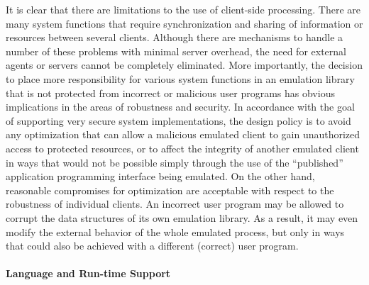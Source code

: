 
It is clear that there are limitations to the use of client-side
processing. There are many system functions that require
synchronization and sharing of information or resources between
several clients.  Although there are mechanisms to handle a number of
these problems with minimal server overhead, the need for external
agents or servers cannot be completely eliminated. More importantly,
the decision to place more responsibility for various system functions
in an emulation library that is not protected from incorrect or
malicious user programs has obvious implications in the areas of
robustness and security. In accordance with the goal of supporting
very secure system implementations, the design policy is to avoid any
optimization that can allow a malicious emulated client to gain
unauthorized access to protected resources, or to affect the integrity
of another emulated client in ways that would not be possible simply
through the use of the ``published'' application programming interface
being emulated.  On the other hand, reasonable compromises for
optimization are acceptable with respect to the robustness of
individual clients. An incorrect user program may be allowed to
corrupt the data structures of its own emulation library. As a result,
it may even modify the external behavior of the whole emulated
process, but only in ways that could also be achieved with a different
(correct) user program.

\paragraph{Language and Run-time Support}

